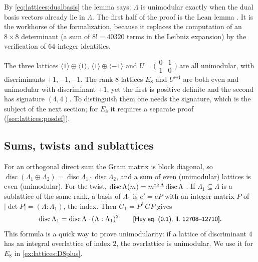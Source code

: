 By \eqref{eq:lattices:dualbasis} the lemma says: $\Lambda$ is unimodular exactly when the dual
basis vectors already lie in $\Lambda$. The first half of the proof is the Lean lemma
. It is the workhorse of the formalization, because it
replaces the computation of an $8\times8$ determinant (a sum of $8!=40320$ terms in the
Leibniz expansion) by the verification of $64$ integer identities.

\begin{pitfallbox}[Unimodular does not mean ``$\det=+1$'', and says nothing about the sign of
the form]
The three lattices $\langle1\rangle\oplus\langle1\rangle$,
$\langle1\rangle\oplus\langle-1\rangle$ and
$U=\bigl(\begin{smallmatrix}0&1\\1&0\end{smallmatrix}\bigr)$ are all unimodular, with
discriminants $+1,-1,-1$. The rank-$8$ lattices $E_8$ and $U^{\oplus4}$ are both even and
unimodular with discriminant $+1$, yet the first is positive definite and the second has
signature $(4,4)$. To distinguish them one needs the signature, which is the subject of the
next section; for $E_8$ it requires a separate proof (\cref{sec:lattices:posdef}).
\end{pitfallbox}

\subsection{Sums, twists and sublattices}
For an orthogonal direct sum the Gram matrix is block diagonal, so
$\operatorname{disc}(\Lambda_1\oplus\Lambda_2)=\operatorname{disc}\Lambda_1\cdot
\operatorname{disc}\Lambda_2$, and a sum of even (unimodular) lattices is even (unimodular).
For the twist, $\operatorname{disc}\Lambda(m)=m^{\operatorname{rk}\Lambda}\operatorname{disc}\Lambda$
. If $\Lambda_1\subseteq\Lambda$ is a sublattice of
the same rank, a basis of $\Lambda_1$ is $e'=eP$ with an integer matrix $P$ of
$|\det P|=(\Lambda:\Lambda_1)$, the index. Then $G_1=P^{\mathsf T}GP$ gives
\begin{equation}\label{eq:lattices:indexformula}
 \operatorname{disc}\Lambda_1=\operatorname{disc}\Lambda\cdot(\Lambda:\Lambda_1)^2
 \qquad\text{{\small\textsf{[Huy eq.~(0.1), ll.~12708--12710]}}} .
\end{equation}
This formula is a quick way to prove unimodularity: if a lattice of discriminant $4$ has an
integral overlattice of index $2$, the overlattice is unimodular. We use it for $E_8$ in
\cref{ex:lattices:D8plus}.

